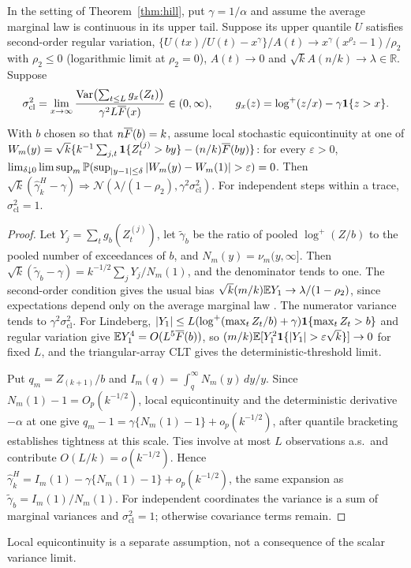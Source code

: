 \begin{theorem}\label{thm:hillclt}
In the setting of Theorem~\ref{thm:hill}, put $\gamma=1/\alpha$ and assume the average marginal law is continuous in its upper tail. Suppose its upper quantile $U$ satisfies second-order regular variation, $\{U(tx)/U(t)-x^\gamma\}/A(t)\to x^\gamma(x^{\rho_2}-1)/\rho_2$ with $\rho_2\le0$ (logarithmic limit at $\rho_2=0$), $A(t)\to0$ and $\sqrt kA(n/k)\to\lambda\in\mathbb R$. Suppose
\begin{equation}\label{eq:sigmacl}
\sigma_{\mathrm{cl}}^2=\lim_{x\to\infty}\frac{\operatorname{Var}\bigl(\sum_{t\le L}g_x(Z_t)\bigr)}{\gamma^2L\overline{F}(x)}\in(0,\infty),\qquad g_x(z)=\log^+(z/x)-\gamma\mathbf{1}\{z>x\}.
\end{equation}
With $b$ chosen so that $n\overline{F}(b)=k$, assume local stochastic equicontinuity at one of $W_m(y)=\sqrt k\{k^{-1}\sum_{j,t}\mathbf{1}\{Z_t^{(j)}>by\}-(n/k)\overline{F}(by)\}$: for every $\varepsilon>0$, $\lim_{\delta\downarrow0}\limsup_m\PP(\sup_{|y-1|\le\delta}|W_m(y)-W_m(1)|>\varepsilon)=0$. Then $\sqrt k(\hat\gamma_k^H-\gamma)\Rightarrow\mathcal N(\lambda/(1-\rho_2),\gamma^2\sigma_{\mathrm{cl}}^2)$. For independent steps within a trace, $\sigma_{\mathrm{cl}}^2=1$.
\end{theorem}

\begin{proof}
Let $Y_j=\sum_tg_b(Z_t^{(j)})$, let $\tilde\gamma_b$ be the ratio of pooled $\log^+(Z/b)$ to the pooled number of exceedances of $b$, and $N_m(y)=\nu_m(y,\infty]$. Then $\sqrt k(\tilde\gamma_b-\gamma)=k^{-1/2}\sum_jY_j/N_m(1)$, and the denominator tends to one. The second-order condition gives the usual bias $\sqrt k(m/k)\mathbb{E} Y_1\to\lambda/(1-\rho_2)$, since expectations depend only on the average marginal law \citep{dehaan2006}. The numerator variance tends to $\gamma^2\sigma_{\mathrm{cl}}^2$. For Lindeberg, $|Y_1|\le L(\log^+(\max_tZ_t/b)+\gamma)\mathbf{1}\{\max_tZ_t>b\}$ and regular variation give $\mathbb{E} Y_1^4=O(L^5\overline{F}(b))$, so $(m/k)\EE[Y_1^2\1\{|Y_1|>\varepsilon\sqrt k\}]\to0$ for fixed $L$, and the triangular-array CLT gives the deterministic-threshold limit.

Put $q_m=Z_{(k+1)}/b$ and $I_m(q)=\int_q^\infty N_m(y)\,dy/y$. Since $N_m(1)-1=O_p(k^{-1/2})$, local equicontinuity and the deterministic derivative $-\alpha$ at one give $q_m-1=\gamma\{N_m(1)-1\}+o_p(k^{-1/2})$, after quantile bracketing establishes tightness at this scale. Ties involve at most $L$ observations a.s.\ and contribute $O(L/k)=o(k^{-1/2})$. Hence $\hat\gamma_k^H=I_m(1)-\gamma\{N_m(1)-1\}+o_p(k^{-1/2})$, the same expansion as $\tilde\gamma_b=I_m(1)/N_m(1)$. For independent coordinates the variance is a sum of marginal variances and $\sigma_{\mathrm{cl}}^2=1$; otherwise covariance terms remain.
\end{proof}

Local equicontinuity is a separate assumption, not a consequence of the scalar variance limit.
